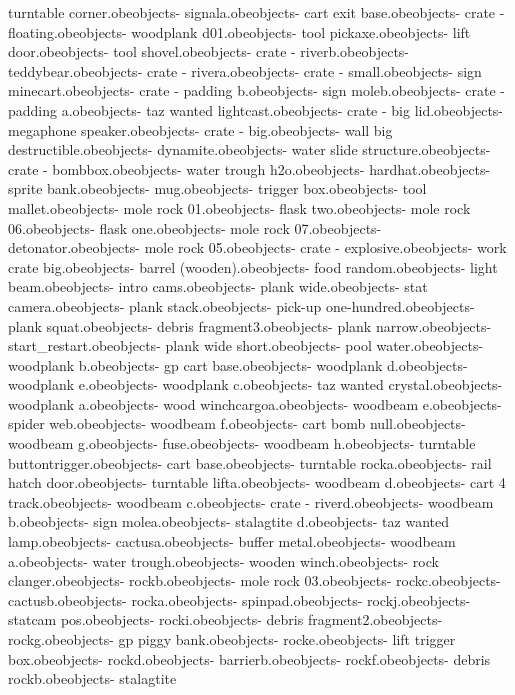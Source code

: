 turntable corner.obe objects\bank - signala.obe objects\bank - cart exit base.obe objects\bank - crate - floating.obe objects\bank - woodplank d01.obe objects\bank - tool pickaxe.obe objects\bank - lift door.obe objects\bank - tool shovel.obe objects\bank - crate - riverb.obe objects\bank - teddybear.obe objects\bank - crate - rivera.obe objects\bank - crate - small.obe objects\bank - sign minecart.obe objects\bank - crate - padding b.obe objects\bank - sign moleb.obe objects\bank - crate - padding a.obe objects\bank - taz wanted lightcast.obe objects\bank - crate - big lid.obe objects\bank - megaphone speaker.obe objects\bank - crate - big.obe objects\bank - wall big destructible.obe objects\bank - dynamite.obe objects\bank - water slide structure.obe objects\bank - crate - bombbox.obe objects\bank - water trough h2o.obe objects\bank - hardhat.obe objects\bank - sprite bank.obe objects\bank - mug.obe objects\bank - trigger box.obe objects\bank - tool mallet.obe objects\bank - mole rock 01.obe objects\bank - flask two.obe objects\bank - mole rock 06.obe objects\bank - flask one.obe objects\bank - mole rock 07.obe objects\bank - detonator.obe objects\bank - mole rock 05.obe objects\bank - crate - explosive.obe objects\bank - work crate big.obe objects\bank - barrel (wooden).obe objects\bank - food random.obe objects\bank - light beam.obe objects\bank - intro cams.obe objects\bank - plank wide.obe objects\bank - stat camera.obe objects\bank - plank stack.obe objects\bank - pick-up one-hundred.obe objects\bank - plank squat.obe objects\bank - debris fragment3.obe objects\bank - plank narrow.obe objects\bank - start_restart.obe objects\bank - plank wide short.obe objects\bank - pool water.obe objects\bank - woodplank b.obe objects\bank - gp cart base.obe objects\bank - woodplank d.obe objects\bank - woodplank e.obe objects\bank - woodplank c.obe objects\bank - taz wanted crystal.obe objects\bank - woodplank a.obe objects\bank - wood winchcargoa.obe objects\bank - woodbeam e.obe objects\bank - spider web.obe objects\bank - woodbeam f.obe objects\bank - cart bomb null.obe objects\bank - woodbeam g.obe objects\bank - fuse.obe objects\bank - woodbeam h.obe objects\bank - turntable buttontrigger.obe objects\bank - cart base.obe objects\bank - turntable rocka.obe objects\bank - rail hatch door.obe objects\bank - turntable lifta.obe objects\bank - woodbeam d.obe objects\bank - cart 4 track.obe objects\bank - woodbeam c.obe objects\bank - crate - riverd.obe objects\bank - woodbeam b.obe objects\bank - sign molea.obe objects\bank - stalagtite d.obe objects\bank - taz wanted  lamp.obe objects\bank - cactusa.obe objects\bank - buffer metal.obe objects\bank - woodbeam a.obe objects\bank - water trough.obe objects\bank - wooden winch.obe objects\bank - rock clanger.obe objects\bank - rockb.obe objects\bank - mole rock 03.obe objects\bank - rockc.obe objects\bank - cactusb.obe objects\bank - rocka.obe objects\bank - spinpad.obe objects\bank - rockj.obe objects\bank - statcam pos.obe objects\bank - rocki.obe objects\bank - debris fragment2.obe objects\bank - rockg.obe objects\bank - gp piggy bank.obe objects\bank - rocke.obe objects\bank - lift trigger box.obe objects\bank - rockd.obe objects\bank - barrierb.obe objects\bank - rockf.obe objects\bank - debris rockb.obe objects\bank - stalagtite 